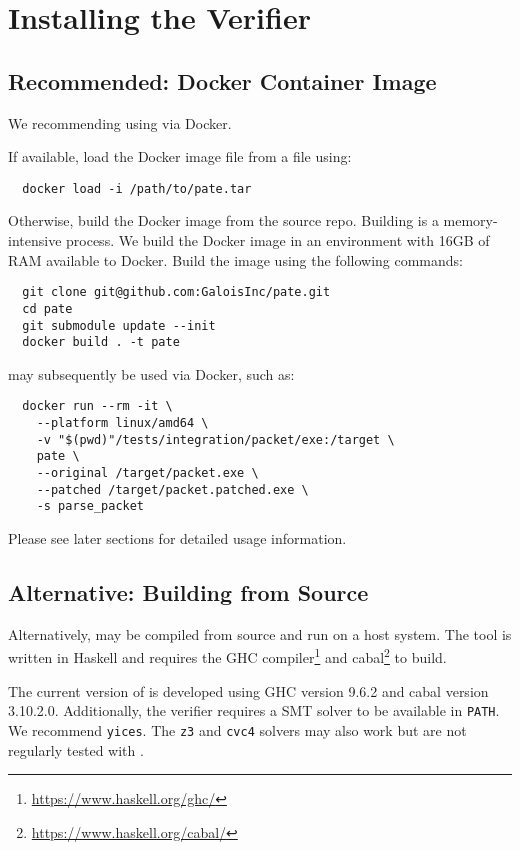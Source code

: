 \section{Installing the \pate{} Verifier}
\label{sec:build-pate-verif}

\subsection{Recommended: Docker Container Image}

We recommending using \pate{} via Docker.

If available, load the Docker image file from a file using:
\begin{verbatim}
  docker load -i /path/to/pate.tar
\end{verbatim}

Otherwise, build the Docker image from the \pate{} source repo.
Building \pate{} is a memory-intensive process.
We build the Docker image in an environment with 16GB of RAM available to Docker.
Build the image using the following commands:

\begin{verbatim}
  git clone git@github.com:GaloisInc/pate.git
  cd pate
  git submodule update --init
  docker build . -t pate
\end{verbatim}

\pate{} may subsequently be used via Docker, such as:

\begin{verbatim}
  docker run --rm -it \
    --platform linux/amd64 \
    -v "$(pwd)"/tests/integration/packet/exe:/target \
    pate \
    --original /target/packet.exe \
    --patched /target/packet.patched.exe \
    -s parse_packet
\end{verbatim}

Please see later sections for detailed usage information.

\subsection{Alternative: Building from Source}

Alternatively, \pate{} may be compiled from source and run on a host system.
The \pate{} tool is written in Haskell and requires the GHC compiler\footnote{\url{https://www.haskell.org/ghc/}} and cabal\footnote{\url{https://www.haskell.org/cabal/}} to build.

The current version of \pate{} is developed using GHC version 9.6.2 and cabal version 3.10.2.0.
Additionally, the verifier requires a SMT solver to be available in \texttt{PATH}.
We recommend \texttt{yices}.
The \texttt{z3} and \texttt{cvc4} solvers may also work but are not regularly tested with \pate{}.

